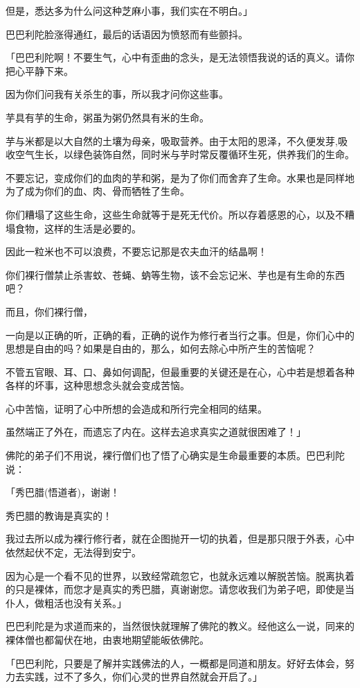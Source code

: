 \documentclass[twoside,openany]{book}
\begin{document}
但是，悉达多为什么问这种芝麻小事，我们实在不明白。」

巴巴利陀脸涨得通红，最后的话语因为愤怒而有些颤抖。

「巴巴利陀啊！不要生气，心中有歪曲的念头，是无法领悟我说的话的真义。请你把心平静下来。

因为你们问我有关杀生的事，所以我才问你这些事。

芋具有芋的生命，粥虽为粥仍然具有米的生命。

芋与米都是以大自然的土壤为母亲，吸取营养。由于太阳的恩泽，不久便发芽,吸收空气生长，以绿色装饰自然，同时米与芋时常反覆循环生死，供养我们的生命。

不要忘记，变成你们的血肉的芋和粥，是为了你们而舍弃了生命。水果也是同样地为了成为你们的血、肉、骨而牺牲了生命。

你们糟塌了这些生命，这些生命就等于是死无代价。所以存着感恩的心，以及不糟塌食物，这样的生活是必要的。

因此一粒米也不可以浪费，不要忘记那是农夫血汗的结晶啊！

你们裸行僧禁止杀害蚊、苍蝇、蚋等生物，该不会忘记米、芋也是有生命的东西吧？

而且，你们裸行僧，

一向是以正确的听，正确的看，正确的说作为修行者当行之事。但是，你们心中的思想是自由的吗？如果是自由的，那么，如何去除心中所产生的苦恼呢？

不管五官眼、耳、口、鼻如何调配，但最重要的关键还是在心，心中若是想着各种各样的坏事，这种思想念头就会变成苦恼。

心中苦恼，证明了心中所想的会造成和所行完全相同的结果。

虽然端正了外在，而遗忘了内在。这样去追求真实之道就很困难了！」

佛陀的弟子们不用说，裸行僧们也了悟了心确实是生命最重要的本质。巴巴利陀说：

「秀巴腊(悟道者)，谢谢！

秀巴腊的教诲是真实的！

我过去所以成为裸行修行者，就在企图抛开一切的执着，但是那只限于外表，心中依然起伏不定，无法得到安宁。

因为心是一个看不见的世界，以致经常疏忽它，也就永远难以解脱苦恼。脱离执着的只是裸体，而您才是真实的秀巴腊，真谢谢您。请您收我们为弟子吧，即使是当仆人，做粗活也没有关系。」

巴巴利陀是为求道而来的，当然很快就理解了佛陀的教义。经他这么一说，同来的裸体僧也都匐伏在地，由衷地期望能皈依佛陀。

「巴巴利陀，只要是了解并实践佛法的人，一概都是同道和朋友。好好去体会，努力去实践，过不了多久，你们心灵的世界自然就会开启了。」
\end{document}
